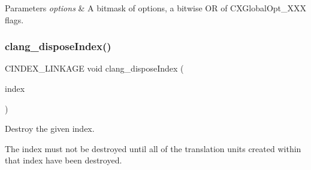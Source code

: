 \begin{DoxyParams}{Parameters}
{\em options} & A bitmask of options, a bitwise OR of C\+X\+Global\+Opt\+\_\+\+X\+XX flags. \\
\hline
\end{DoxyParams}
\mbox{\label{group__CINDEX_ga166ab73b14be73cbdcae14d62dbab22a}} 
\subsubsection{\texorpdfstring{clang\+\_\+dispose\+Index()}{clang\_disposeIndex()}}
{\footnotesize\ttfamily C\+I\+N\+D\+E\+X\+\_\+\+L\+I\+N\+K\+A\+GE void clang\+\_\+dispose\+Index (\begin{DoxyParamCaption}\item[{\hyperlink{group__CINDEX_gae039c2574bfd75774ca7a9a3e55910cb}{C\+X\+Index}}]{index }\end{DoxyParamCaption})}



Destroy the given index. 

The index must not be destroyed until all of the translation units created within that index have been destroyed. 